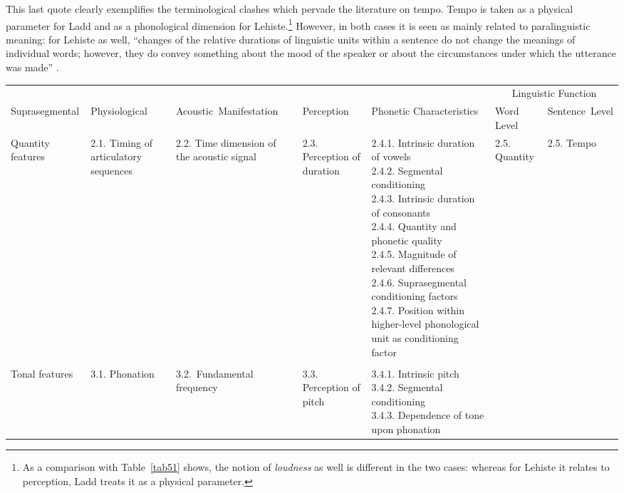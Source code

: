 This last quote clearly exemplifies the terminological clashes which pervade the literature on tempo. Tempo is taken as a physical parameter for Ladd and as a phonological dimension for Lehiste.\footnote{As a comparison with Table~\ref{tab51} shows, the notion of \textit{loudness} as well is different in the two cases: whereas for Lehiste it relates to perception, Ladd treats it as a physical parameter.} However, in both cases it is seen as mainly related to paralinguistic meaning: for Lehiste as well, ``changes of the relative durations of linguistic units within a sentence do not change the meanings of individual words; however, they do convey something about the mood of the speaker or about the circumstances under which the utterance was made'' \cite[§2.5.3]{lehiste1970suprasegmentals}.

\begin{landscape}
\begin{table}[p]
\centering
\raggedright
\scriptsize
\begin{tabular}{lp{1.8cm}p{2.7cm}p{2cm}llp{1.6cm}}
\mytoprule
& & & & & \multicolumn{2}{c}{Linguistic Function}\\
Suprasegmental & Physiological & \mbox{Acoustic Manifestation} & Perception & Phonetic Characteristics & Word Level & \mbox{Sentence Level} \\
\midrule
{Quantity features} & {2.1. Timing of articulatory sequences} & {2.2. Time dimension of the acoustic signal} & {2.3. Perception of duration} & \parbox[t]{3cm}{\raggedright 2.4.1. Intrinsic duration of vowels\\
2.4.2. Segmental conditioning \\
2.4.3. Intrinsic duration of consonants \\
2.4.4. Quantity and phonetic quality \\
2.4.5. Magnitude of relevant differences\\
2.4.6. Suprasegmental conditioning factors\\
2.4.7. Position within higher-level phonological unit as conditioning factor
}& {2.5. Quantity} & {2.5. Tempo} \\
& & \\
{Tonal features} & {3.1. Phonation} & {\raggedright \mbox{3.2. Fundamental\hspace{1cm}} \mbox{frequency}} & {3.3. Perception of pitch} & \parbox[t]{3cm}{\raggedright 3.4.1. Intrinsic pitch \\
3.4.2. Segmental conditioning \\
3.4.3. Dependence of tone upon phonation \\
}
\end{tabular}
\end{table}
\end{landscape}
